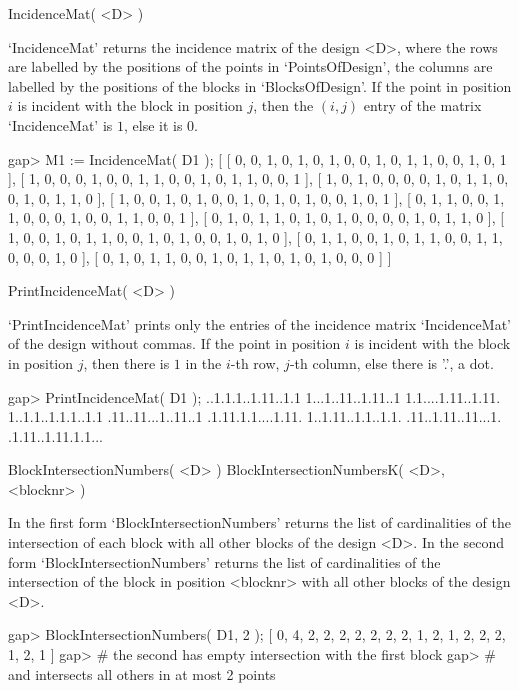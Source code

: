 \>IncidenceMat( <D> )

`IncidenceMat' returns the incidence matrix of the design <D>, where the
rows are labelled by the positions of the points in `PointsOfDesign', the
columns are labelled by the positions of the blocks in `BlocksOfDesign'.
If the point in position $i$ is incident with the block in position $j$, then
the $( i, j )$ entry of the matrix `IncidenceMat' is $1$, else it is $0$.

\beginexample
    gap> M1 := IncidenceMat( D1 );
    [ [ 0, 0, 1, 0, 1, 0, 1, 0, 0, 1, 0, 1, 1, 0, 0, 1, 0, 1 ], 
      [ 1, 0, 0, 0, 1, 0, 0, 1, 1, 0, 0, 1, 0, 1, 1, 0, 0, 1 ], 
      [ 1, 0, 1, 0, 0, 0, 0, 1, 0, 1, 1, 0, 0, 1, 0, 1, 1, 0 ], 
      [ 1, 0, 0, 1, 0, 1, 0, 0, 1, 0, 1, 0, 1, 0, 0, 1, 0, 1 ], 
      [ 0, 1, 1, 0, 0, 1, 1, 0, 0, 0, 1, 0, 0, 1, 1, 0, 0, 1 ], 
      [ 0, 1, 0, 1, 1, 0, 1, 0, 1, 0, 0, 0, 0, 1, 0, 1, 1, 0 ], 
      [ 1, 0, 0, 1, 0, 1, 1, 0, 0, 1, 0, 1, 0, 0, 1, 0, 1, 0 ], 
      [ 0, 1, 1, 0, 0, 1, 0, 1, 1, 0, 0, 1, 1, 0, 0, 0, 1, 0 ], 
      [ 0, 1, 0, 1, 1, 0, 0, 1, 0, 1, 1, 0, 1, 0, 1, 0, 0, 0 ] ]
\endexample

\>PrintIncidenceMat( <D> )

`PrintIncidenceMat' prints only the entries of the incidence matrix 
`IncidenceMat' of the design without commas. If the point in position $i$ is 
incident with the block in position $j$, then there is $1$ in the $i$-th
row, $j$-th column, else there is '.', a dot.

\beginexample
    gap> PrintIncidenceMat( D1 );
    ..1.1.1..1.11..1.1
    1...1..11..1.11..1
    1.1....1.11..1.11.
    1..1.1..1.1.1..1.1
    .11..11...1..11..1
    .1.11.1.1....1.11.
    1..1.11..1.1..1.1.
    .11..1.11..11...1.
    .1.11..1.11.1.1...
\endexample

\>BlockIntersectionNumbers( <D> )
\>BlockIntersectionNumbersK( <D>, <blocknr> )

In the first form `BlockIntersectionNumbers' returns the list of 
cardinalities of the intersection of each block with all other blocks of the
design <D>.
In the second form `BlockIntersectionNumbers' returns the list of 
cardinalities of the intersection of the block in position <blocknr>  with 
all other blocks of the design <D>. 

\beginexample
    gap> BlockIntersectionNumbers( D1, 2 );
    [ 0, 4, 2, 2, 2, 2, 2, 2, 2, 1, 2, 1, 2, 2, 2, 1, 2, 1 ]
    gap> # the second has empty intersection with the first block
    gap> # and intersects all others in at most 2 points
\endexample

